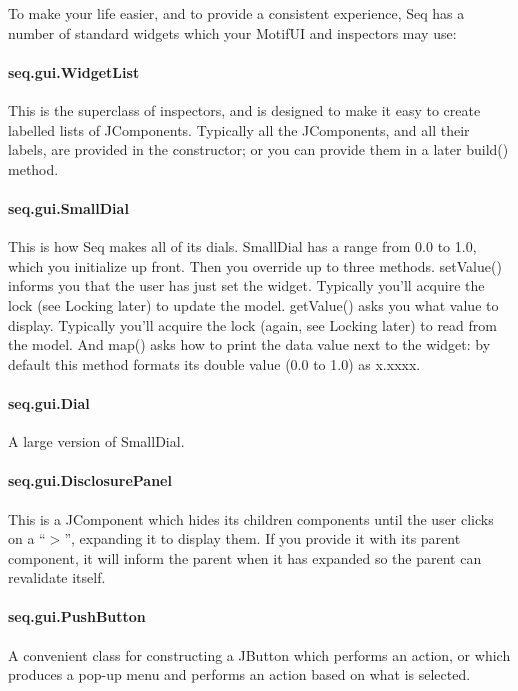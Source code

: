 \documentclass[twoside,10pt]{article}
\begin{document}
To make your life easier, and to provide a consistent experience, Seq has a number of standard widgets which your MotifUI and inspectors may use:

\paragraph{seq.gui.WidgetList}  This is the superclass of inspectors, and is designed to make it easy to create labelled lists of JComponents.  Typically all the JComponents, and all their labels, are provided in the constructor; or you can provide them in a later {\sf build()} method.

\paragraph{seq.gui.SmallDial}  This is how Seq makes all of its dials.  SmallDial has a range from 0.0 to 1.0, which you initialize up front.  Then you override up to three methods.  {\sf setValue()} informs you that the user has just set the widget.  Typically you'll acquire the lock (see Locking later) to update the model.  {\sf getValue()} asks you what value to display.  Typically you'll acquire the lock (again, see Locking later) to read from the model.  And {\sf map()} asks how to print the data value next to the widget: by default this method formats its double value (0.0 to 1.0) as x.xxxx.

\paragraph{seq.gui.Dial}  A large version of SmallDial.

\paragraph{seq.gui.DisclosurePanel}  This is a JComponent which hides its children components until the user clicks on a ``\(>\)'', expanding it to display them.  If you provide it with its parent component, it will inform the parent when it has expanded so the parent can revalidate itself.

\paragraph{seq.gui.PushButton}  A convenient class for constructing a JButton which performs an action, or which produces a pop-up menu and performs an action based on what is selected.
\end{document}
